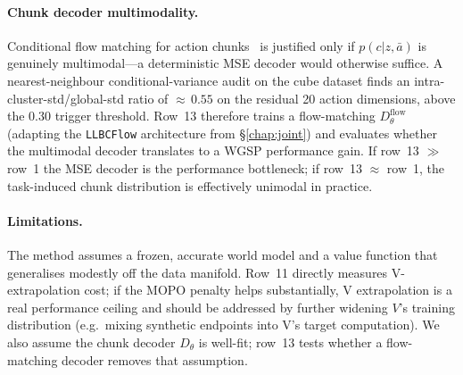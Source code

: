 \paragraph{Chunk decoder multimodality.}
Conditional flow matching for action chunks~\citep{qchunking} is
justified only if $p(c|z,\bar a)$ is genuinely multimodal---a
deterministic MSE decoder would otherwise suffice. A nearest-neighbour
conditional-variance audit on the cube dataset finds an
intra-cluster-std/global-std ratio of ${\approx}\,0.55$ on the
residual 20 action dimensions, above the $0.30$ trigger threshold.
Row~13 therefore trains a flow-matching $D^\text{flow}_\theta$ (adapting
the \texttt{LLBCFlow} architecture from \S\ref{chap:joint}) and
evaluates whether the multimodal decoder translates to a WGSP
performance gain. If row~13 $\gg$ row~1 the MSE decoder is the
performance bottleneck; if row~13 $\approx$ row~1, the task-induced
chunk distribution is effectively unimodal in practice.

\paragraph{Limitations.}
The method assumes a frozen, accurate world model and a value function
that generalises modestly off the data manifold. Row~11 directly
measures V-extrapolation cost; if the MOPO penalty helps substantially,
V extrapolation is a real performance ceiling and should be addressed by
further widening $V$'s training distribution (e.g.\ mixing synthetic
endpoints into V's target computation). We also assume the chunk
decoder $D_\theta$ is well-fit; row~13 tests whether a flow-matching
decoder removes that assumption.

